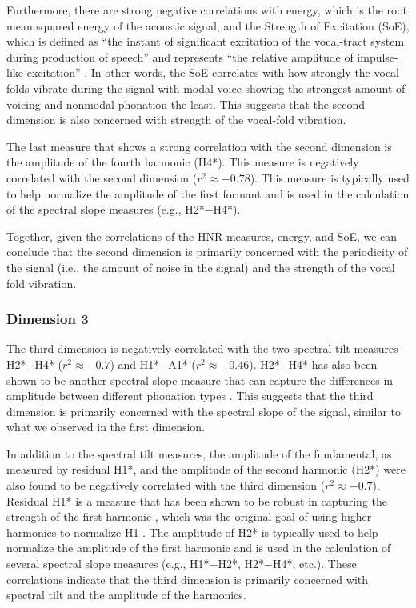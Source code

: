 Furthermore, there are strong negative correlations with energy, which is the root mean squared energy of the acoustic signal, and the Strength of Excitation (SoE), which is defined as ``the instant of significant excitation of the vocal-tract system during production of speech'' and represents ``the relative amplitude of impulse-like excitation'' \citep[1934]{mittalStudyEffectsVocal2014}. In other words, the SoE correlates with how strongly the vocal folds vibrate during the signal with modal voice showing the strongest amount of voicing and nonmodal phonation the least. This suggests that the second dimension is also concerned with strength of the vocal-fold vibration.

The last measure that shows a strong correlation with the second dimension is the amplitude of the fourth harmonic (H4*). This measure is negatively correlated with the second dimension ($r^{2} \approx -0.78$). This measure is typically used to help normalize the amplitude of the first formant and is used in the calculation of the spectral slope measures (e.g., H2*$-$H4*).

Together, given the correlations of the HNR measures, energy, and SoE, we can conclude that the second dimension is primarily concerned with the periodicity of the signal (i.e., the amount of noise in the signal) and the strength of the vocal fold vibration.

\subsubsection{Dimension 3} \label{sec:acousticlandscape:dim3}
The third dimension is negatively correlated with the two spectral tilt measures H2*$-$H4* ($r^{2} \approx -0.7$) and H1*$-$A1* ($r^{2} \approx -0.46$). H2*$-$H4* has also been shown to be another spectral slope measure that can capture the differences in amplitude between different phonation types \citep{garellekPhoneticsVoice2019,garellekModelingVoiceSource2016,kreimanUnifiedTheoryVoice2014,kreimanValidatingPsychoacousticModel2021}. This suggests that the third dimension is primarily concerned with the spectral slope of the signal, similar to what we observed in the first dimension.

In addition to the spectral tilt measures, the amplitude of the fundamental, as measured by residual H1*, and the amplitude of the second harmonic (H2*) were also found to be negatively correlated with the third dimension ($r^{2} \approx -0.7$). Residual H1* is a measure that has been shown to be robust in capturing the strength of the first harmonic \citep{chaiH1H2AcousticMeasure2022,brinkerhoffUsingResidualH12025}, which was the original goal of using higher harmonics to normalize H1 \citep{fischer-jorgensenPhoneticAnalysisBreathy1968}. The amplitude of H2* is typically used to help normalize the amplitude of the first harmonic and is used in the calculation of several spectral slope measures (e.g., H1*$-$H2*, H2*$-$H4*, etc.). These correlations indicate that the third dimension is primarily concerned with spectral tilt and the amplitude of the harmonics. 


